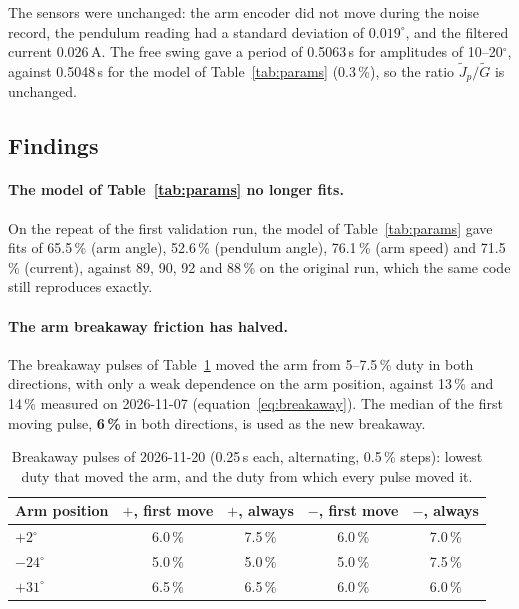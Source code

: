 \documentclass[a4paper,11pt]{article}
\begin{document}
The sensors were unchanged: the arm encoder did not move during the noise record, the pendulum reading had a standard deviation of $0.019^\circ$, and the filtered current $0.026$\,A. The free swing gave a period of 0.5063\,s for amplitudes of 10--20$^\circ$, against 0.5048\,s for the model of Table~\ref{tab:params} (0.3\,\%), so the ratio $\tilde J_p/\tilde G$ is unchanged.

\subsection{Findings}
\label{sec:reid_findings}
\paragraph{The model of Table~\ref{tab:params} no longer fits.} On the repeat of the first validation run, the model of Table~\ref{tab:params} gave fits of 65.5\,\% (arm angle), 52.6\,\% (pendulum angle), 76.1\,\% (arm speed) and 71.5\,\% (current), against 89, 90, 92 and 88\,\% on the original run, which the same code still reproduces exactly.

\paragraph{The arm breakaway friction has halved.} The breakaway pulses of Table~\ref{tab:reid_breakaway} moved the arm from 5--7.5\,\% duty in both directions, with only a weak dependence on the arm position, against 13\,\% and 14\,\% measured on 2026-11-07 (equation~\ref{eq:breakaway}). The median of the first moving pulse, \textbf{6\,\%} in both directions, is used as the new breakaway.

\begin{table}[h]
\centering
\caption{Breakaway pulses of 2026-11-20 (0.25\,s each, alternating, 0.5\,\% steps): lowest duty that moved the arm, and the duty from which every pulse moved it.}
\label{tab:reid_breakaway}
\small
\begin{tabular}{@{}lcccc@{}}
\toprule
Arm position & $+$, first move & $+$, always & $-$, first move & $-$, always \\
\midrule
$+2^\circ$ & 6.0\,\% & 7.5\,\% & 6.0\,\% & 7.0\,\% \\
$-24^\circ$ & 5.0\,\% & 5.0\,\% & 5.0\,\% & 7.5\,\% \\
$+31^\circ$ & 6.5\,\% & 6.5\,\% & 6.0\,\% & 6.0\,\% \\
\bottomrule
\end{tabular}
\end{table}
\end{document}
